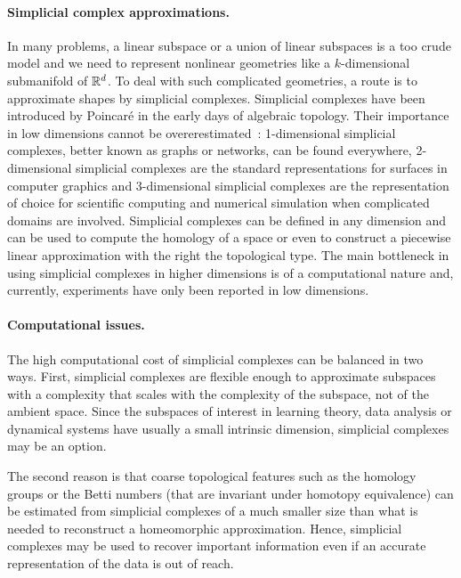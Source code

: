 \paragraph{Simplicial complex approximations.}
In many problems, a linear subspace or a union of linear subspaces is a too crude model and we need to represent nonlinear geometries like a $k$-dimensional submanifold of $\mathbb R^d$.  To deal with such complicated geometries, a route is to approximate shapes by simplicial complexes.  Simplicial complexes have been introduced by Poincar\'e in the early days of algebraic topology. Their importance in low dimensions cannot be overerestimated~: 1-dimensional simplicial complexes, better known as graphs or networks, can be found everywhere, 2-dimensional simplicial complexes are the standard representations for surfaces in computer graphics and 3-dimensional simplicial complexes are the representation of choice for scientific computing and numerical simulation when complicated domains are involved. Simplicial complexes can be defined in any dimension and can be used to compute the homology of a space or even to construct a piecewise linear approximation with the right the topological type. The main bottleneck in using simplicial complexes in higher dimensions is of a computational nature and, currently, experiments have only been reported in low dimensions.

\paragraph{Computational issues.}
The high computational cost of simplicial complexes can be balanced in two ways. First, simplicial complexes are flexible enough to approximate subspaces with a complexity that scales with the complexity of the subspace, not of the ambient space. Since the subspaces of interest 
 in learning theory, data analysis or dynamical systems have usually a small intrinsic dimension,
simplicial complexes may be an option.

The second reason is that coarse topological features such as the homology groups or the Betti numbers (that are invariant under homotopy equivalence) can be estimated from simplicial complexes of a much smaller size than what is needed to reconstruct a homeomorphic approximation. Hence, simplicial complexes may be used to recover important information even if an accurate representation of the data is out of reach.

